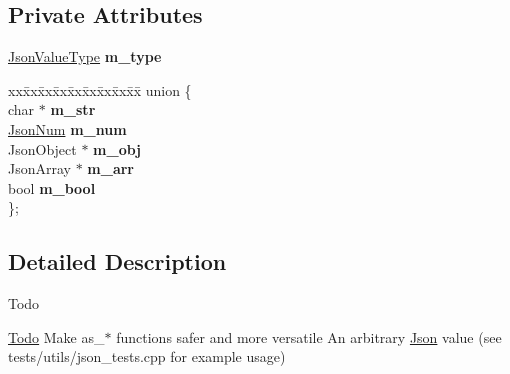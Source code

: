 \subsection*{Private Attributes}
\begin{DoxyCompactItemize}
\item 
\mbox{\label{classnta_1_1utils_1_1Json_ab4a7cc232d1c4ba37f9dcb35f0ac5417}} 
\hyperlink{namespacenta_1_1utils_ac9921c0a3baf86d9facdc4927c66def3}{Json\+Value\+Type} {\bfseries m\+\_\+type}
\item 
\mbox{\label{classnta_1_1utils_1_1Json_a6a4d3082c4d8f9987cb8ce281b87744d}} 
\begin{tabbing}
xx\=xx\=xx\=xx\=xx\=xx\=xx\=xx\=xx\=\kill
union \{\\
\mbox{\label{classnta_1_1utils_1_1Json_ad70123a682fef22afdcf75d20d028e3e}} 
char $\ast$ {\bfseries m\_str}\\
\mbox{\label{classnta_1_1utils_1_1Json_aad4acf20f0eef3112e633df34b799b5a}} 
\hyperlink{classnta_1_1utils_1_1JsonNum}{JsonNum} {\bfseries m\_num}\\
\mbox{\label{classnta_1_1utils_1_1Json_a15a631f10ecc26ba5fba053140bc7500}} 
JsonObject $\ast$ {\bfseries m\_obj}\\
\mbox{\label{classnta_1_1utils_1_1Json_a1ddb791c97e2d345cad4ad63bcb38b6b}} 
JsonArray $\ast$ {\bfseries m\_arr}\\
\mbox{\label{classnta_1_1utils_1_1Json_a4ca79ced26d31b35a7d2f9e0fc8ec347}} 
bool {\bfseries m\_bool}\\
\}; \\

\end{tabbing}\end{DoxyCompactItemize}


\subsection{Detailed Description}
\begin{DoxyRefDesc}{Todo}
\item[\hyperlink{todo__todo000006}{Todo}]Make as\+\_\+$\ast$ functions safer and more versatile An arbitrary \hyperlink{classnta_1_1utils_1_1Json}{Json} value (see tests/utils/json\+\_\+tests.\+cpp for example usage) \end{DoxyRefDesc}


